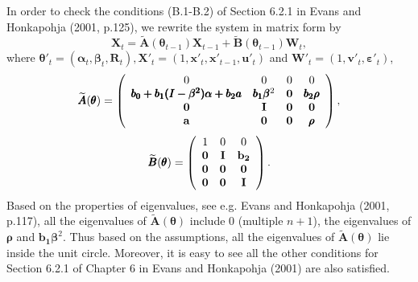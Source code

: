 \begin{appendix}
In order to check the conditions (B.1-B.2) of Section 6.2.1 in Evans
and Honkapohja (2001, p.125), we rewrite the system in matrix form
by
$${\pmb X}_t=\widetilde{{\pmb A}}({\pmb\theta}_{t-1}){\pmb X}_{t-1}+\widetilde{{\pmb B}}({\pmb\theta}_{t-1}){\pmb W}_{t},$$ where
${\pmb\theta}'_t=({\pmb\alpha}_t, {\pmb\beta}_t, {\pmb R}_t), {\pmb X}'_t=(1,{\pmb x}'_t,{\pmb x}'_{t-1},{\pmb u}'_t)$ and
${\pmb W}'_t=(1,{\pmb v}'_t,{\pmb\varepsilon}'_t)$,
\begin{eqnarray*}
{\widetilde{\pmb A}({\pmb\theta})}=\left(\begin{array}{cccc}
0&0&0&0\\
\pmb{b_0+b_1(I-\beta^2)\alpha+b_2a}
&\pmb{b_1\beta}^2&\bf0&\pmb{b_2\rho}\\
\bf0&\bf I&\bf0&\bf0\\
\bf a&\bf0&\bf0&{\pmb\rho}
\end{array}\right),
\end{eqnarray*}
\begin{eqnarray*}
{\widetilde{\pmb B}({\pmb\theta})}=\left(\begin{array}{ccc}
1&  0& 0\\
 \bf0&\bf I&\bf b_2\\
 \bf0& \bf0& \bf0\\
 \bf0& \bf0&\bf I
\end{array}\right).
\end{eqnarray*}
 Based on the properties of eigenvalues, see e.g. Evans and Honkapohja (2001, p.117), all the eigenvalues of ${\widetilde{\pmb A}({\pmb\theta})}$ include $0$ (multiple $n+1$), the eigenvalues of $\pmb\rho$ and $\pmb{b_1\beta}^2$. Thus based on the assumptions, all the eigenvalues of ${\widetilde{\pmb A}({\pmb\theta})}$ lie inside the unit circle. Moreover, it is easy to see all the other conditions for Section 6.2.1 of Chapter 6 in Evans and Honkapohja (2001) are also satisfied.
 

\end{appendix}

